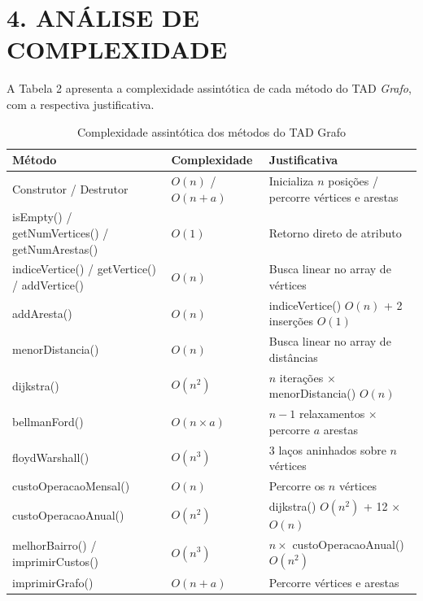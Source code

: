 \documentclass[12pt, a4paper]{article}
\begin{document}
\section*{4. ANÁLISE DE COMPLEXIDADE}

A Tabela 2 apresenta a complexidade assintótica de cada método do TAD \textit{Grafo}, com a respectiva justificativa.

\begin{table}[H]
\centering
\caption{Complexidade assintótica dos métodos do TAD Grafo}
{\footnotesize
\begin{tabular}{p{4.5cm}p{2.5cm}p{5.5cm}}
\toprule
\textbf{Método} & \textbf{Complexidade} & \textbf{Justificativa} \\
\midrule
Construtor / Destrutor & $O(n)$ / $O(n+a)$ & Inicializa $n$ posições / percorre vértices e arestas \\
isEmpty() / getNumVertices() / getNumArestas() & $O(1)$ & Retorno direto de atributo \\
indiceVertice() / getVertice() / addVertice() & $O(n)$ & Busca linear no array de vértices \\
addAresta() & $O(n)$ & indiceVertice() $O(n)$ + 2 inserções $O(1)$ \\
menorDistancia() & $O(n)$ & Busca linear no array de distâncias \\
dijkstra() & $O(n^2)$ & $n$ iterações $\times$ menorDistancia() $O(n)$ \\
bellmanFord() & $O(n \times a)$ & $n-1$ relaxamentos $\times$ percorre $a$ arestas \\
floydWarshall() & $O(n^3)$ & 3 laços aninhados sobre $n$ vértices \\
custoOperacaoMensal() & $O(n)$ & Percorre os $n$ vértices \\
custoOperacaoAnual() & $O(n^2)$ & dijkstra() $O(n^2)$ + 12 $\times$ $O(n)$ \\
melhorBairro() / imprimirCustos() & $O(n^3)$ & $n \times$ custoOperacaoAnual() $O(n^2)$ \\
imprimirGrafo() & $O(n+a)$ & Percorre vértices e arestas \\
\bottomrule
\end{tabular}}
\label{tab:complexidade}
\end{table}
\end{document}

